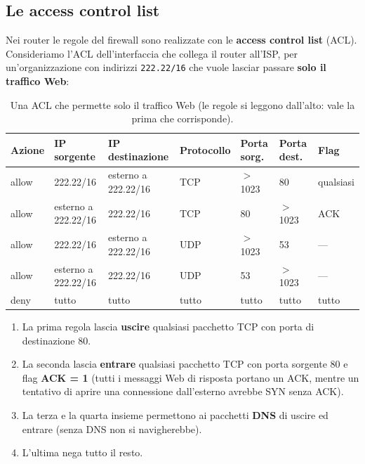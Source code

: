 
\subsection{Le access control list}

Nei router le regole del firewall sono realizzate con le \textbf{access control list} (ACL). Consideriamo l'ACL dell'interfaccia che collega il
router all'ISP, per un'organizzazione con indirizzi \texttt{222.22/16} che vuole lasciar passare \textbf{solo il traffico Web}:

\begin{table}[H]
\centering
\small
\begin{tabular}{lllllll}
\toprule
\textbf{Azione} & \textbf{IP sorgente} & \textbf{IP destinazione} & \textbf{Protocollo} & \textbf{Porta sorg.} & \textbf{Porta dest.} & \textbf{Flag} \\
\midrule
allow & 222.22/16 & esterno a 222.22/16 & TCP & $>$ 1023 & 80 & qualsiasi \\
allow & esterno a 222.22/16 & 222.22/16 & TCP & 80 & $>$ 1023 & ACK \\
allow & 222.22/16 & esterno a 222.22/16 & UDP & $>$ 1023 & 53 & --- \\
allow & esterno a 222.22/16 & 222.22/16 & UDP & 53 & $>$ 1023 & --- \\
deny & tutto & tutto & tutto & tutto & tutto & tutto \\
\bottomrule
\end{tabular}
\caption{Una ACL che permette solo il traffico Web (le regole si leggono dall'alto: vale la prima che corrisponde).}
\end{table}

\begin{enumerate}
    \item La prima regola lascia \textbf{uscire} qualsiasi pacchetto TCP con porta di destinazione 80.
    \item La seconda lascia \textbf{entrare} qualsiasi pacchetto TCP con porta sorgente 80 e flag \textbf{ACK = 1} (tutti i messaggi Web di risposta portano
          un ACK, mentre un tentativo di aprire una connessione dall'esterno avrebbe SYN senza ACK).
    \item La terza e la quarta insieme permettono ai pacchetti \textbf{DNS} di uscire ed entrare (senza DNS non si navigherebbe).
    \item L'ultima nega tutto il resto.
\end{enumerate}


